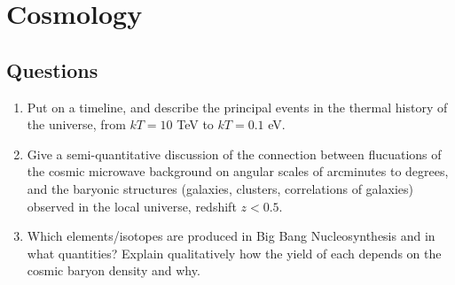 \section{Cosmology}
\subsection{Questions}
\begin{enumerate}
\item Put on a timeline, and describe the principal events in the thermal history of the
universe, from $kT = 10$ TeV to $kT = 0.1$ eV.
\item Give a semi-quantitative discussion of the connection between flucuations of the
cosmic microwave background on angular scales of arcminutes to degrees, and the
baryonic structures (galaxies, clusters, correlations of galaxies) observed in the local
universe, redshift $z < 0.5$.
\item Which elements/isotopes are produced in Big Bang Nucleosynthesis and in what
quantities? Explain qualitatively how the yield of each depends on the cosmic baryon
density and why.
\end{enumerate}
